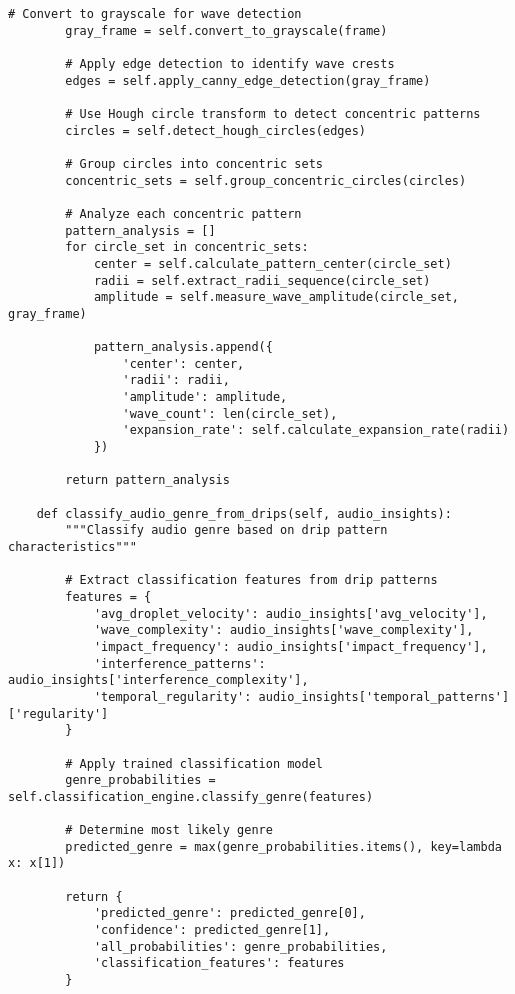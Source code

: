 \documentclass[12pt,a4paper]{article}
\begin{document}
\begin{lstlisting}[style=pythonstyle, caption=Computer Vision Drip Pattern Analysis]
        # Convert to grayscale for wave detection
        gray_frame = self.convert_to_grayscale(frame)
        
        # Apply edge detection to identify wave crests
        edges = self.apply_canny_edge_detection(gray_frame)
        
        # Use Hough circle transform to detect concentric patterns
        circles = self.detect_hough_circles(edges)
        
        # Group circles into concentric sets
        concentric_sets = self.group_concentric_circles(circles)
        
        # Analyze each concentric pattern
        pattern_analysis = []
        for circle_set in concentric_sets:
            center = self.calculate_pattern_center(circle_set)
            radii = self.extract_radii_sequence(circle_set)
            amplitude = self.measure_wave_amplitude(circle_set, gray_frame)
            
            pattern_analysis.append({
                'center': center,
                'radii': radii,
                'amplitude': amplitude,
                'wave_count': len(circle_set),
                'expansion_rate': self.calculate_expansion_rate(radii)
            })
        
        return pattern_analysis
    
    def classify_audio_genre_from_drips(self, audio_insights):
        """Classify audio genre based on drip pattern characteristics"""
        
        # Extract classification features from drip patterns
        features = {
            'avg_droplet_velocity': audio_insights['avg_velocity'],
            'wave_complexity': audio_insights['wave_complexity'],
            'impact_frequency': audio_insights['impact_frequency'],
            'interference_patterns': audio_insights['interference_complexity'],
            'temporal_regularity': audio_insights['temporal_patterns']['regularity']
        }
        
        # Apply trained classification model
        genre_probabilities = self.classification_engine.classify_genre(features)
        
        # Determine most likely genre
        predicted_genre = max(genre_probabilities.items(), key=lambda x: x[1])
        
        return {
            'predicted_genre': predicted_genre[0],
            'confidence': predicted_genre[1],
            'all_probabilities': genre_probabilities,
            'classification_features': features
        }
    

\end{lstlisting}
\end{document}
